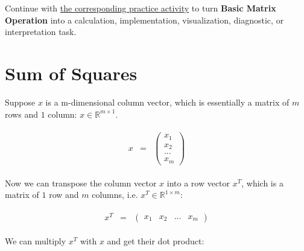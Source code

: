 \documentclass[
  letterpaper,
]{scrbook}
\begin{document}
\begin{tcolorbox}[enhanced jigsaw, arc=.35mm, bottomrule=.15mm, bottomtitle=1mm, breakable, colback=white, colbacktitle=quarto-callout-tip-color!10!white, colframe=quarto-callout-tip-color-frame, coltitle=black, left=2mm, leftrule=.75mm, opacityback=0, opacitybacktitle=0.6, rightrule=.15mm, title=\textcolor{quarto-callout-tip-color}{\faLightbulb}\hspace{0.5em}{Put it into practice}, titlerule=0mm, toprule=.15mm, toptitle=1mm]

Continue with \hyperref[sec-pr-03-basic-matrix-operation]{the
corresponding practice activity} to turn \textbf{Basic Matrix Operation}
into a calculation, implementation, visualization, diagnostic, or
interpretation task.

\end{tcolorbox}

\section{Sum of Squares}\label{sum-of-squares}

Suppose \(x\) is a m-dimensional column vector, which is essentially a
matrix of \(m\) rows and \(1\) column: \(x \in \mathbb{R}^{m\times1}\).

\[\begin{aligned}
  \begin{matrix}
    x & = &
      \begin{pmatrix}
        x_1 \\
        x_2 \\
        ... \\
        x_m
      \end{pmatrix}
    \end{matrix}
\end{aligned}\]

Now we can transpose the column vector \(x\) into a row vector \(x^T\),
which is a matrix of \(1\) row and \(m\) columns, i.e.
\(x^T \in \mathbb{R}^{1\times m}\):

\[\begin{aligned}
  \begin{matrix}
    x^T & = &
      \begin{pmatrix}
        x_1 &
        x_2 &
        ... &
        x_m
      \end{pmatrix}
    \end{matrix}
\end{aligned}\]

We can multiply \(x^T\) with \(x\) and get their dot product:
\end{document}
